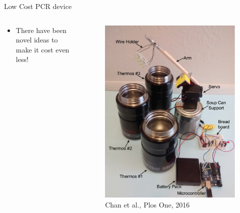 \documentclass[UKenglish, aspectratio = 169]{beamer}
\begin{document}
\begin{frame}{Low Cost PCR device}
	\begin{columns}
		\begin{column}[T]{0.5\textwidth}
			\vspace*{4ex}
			\begin{itemize}
				\item There have been novel ideas to make it cost even less!
			\end{itemize}
		\end{column}
		\begin{column}{0.5\textwidth}
			\begin{figure}
				\centering
				\includegraphics[scale=0.25]{OM-images/pcr2.png}
				\caption{\tiny{Chan et al., Plos One, 2016}}
			\end{figure}
		\end{column}
	\end{columns}
\end{frame}
\end{document}
